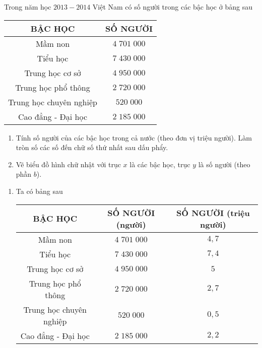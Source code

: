 \begin{bt}%
	Trong năm học $ 2013-2014 $ Việt Nam có số người trong các bậc học ở bảng sau\\
	\begin{center}
		\begin{tabular}{|c|c|}
			\hline
			BẬC HỌC & SỐ NGƯỜI \\ \hline
			Mầm non & $ 4\;701\;000 $ \\ \hline
			Tiểu học & $ 7\;430\;000 $ \\ \hline
			Trung học cơ sở & $ 4\;950\;000 $ \\ \hline
			Trung học phổ thông & $ 2\;720\;000 $ \\ \hline
			Trung học chuyên nghiệp & $ 520\;000 $ \\ \hline
			Cao đẳng - Đại học & $ 2\;185\;000 $ \\ \hline
		\end{tabular}
	\end{center}
	\begin{enumerate}
		\item Tính số người của các bậc học trong cả nước (theo đơn vị triệu người). Làm tròn số các số đến chữ số thứ nhất sau dấu phẩy.
		\item Vẽ biểu đồ hình chữ nhật với trục $ x $ là các bậc học, trục $ y $ là số người (theo phần $ b $).
	\end{enumerate}
	\loigiai
	{
		\begin{enumerate}
			\item Ta có bảng sau\\
			\begin{center}
				\begin{tabular}{|c|c|c|}
					\hline
					BẬC HỌC & SỐ NGƯỜI (người)& SỐ NGƯỜI (triệu người)\\ \hline
					Mầm non & $ 4\;701\;000 $ & $ 4{,}7 $ \\ \hline
					Tiểu học & $ 7\;430\;000 $ & $ 7{,}4 $ \\ \hline
					Trung học cơ sở & $ 4\;950\;000 $ & $ 5 $\\ \hline
					Trung học phổ thông & $ 2\;720\;000 $ & $ 2{,}7 $\\ \hline
					Trung học chuyên nghiệp & $ 520\;000 $ & $ 0{,}5 $\\ \hline
					Cao đẳng - Đại học & $ 2\;185\;000 $ & $ 2{,}2 $\\ \hline
				\end{tabular}
			\end{center}

\end{enumerate}}
\end{bt}

